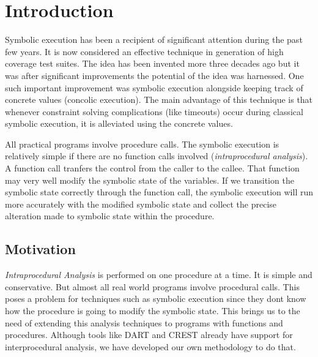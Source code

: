 \documentclass[12pt,oneside]{book}
\begin{document}
\mainmatter


\chapter{Introduction}


\hspace {0.4 cm}
Symbolic execution has been a recipient of significant attention during the past few years. It is now considered an effective technique in generation of high coverage test suites. The idea has been invented more three decades ago\cite{decadeslater} but it was after significant improvements the potential of the idea was harnessed. One such important improvement was symbolic execution alongside keeping track of concrete values (concolic execution)\cite{concolicTesting}. The main advantage of this technique is that whenever constraint solving complications (like timeouts) occur during classical symbolic execution, it is alleviated using the concrete values.

All practical programs involve procedure calls. The symbolic execution is relatively simple if there are no function calls involved (\textit{intraprocedural analysis}). A function call tranfers the control from the caller to the callee. That function may very well modify the symbolic state of the variables. If we transition the symbolic state correctly through the function call, the symbolic execution will run more accurately with the modified symbolic state and collect the precise alteration made to symbolic state within the procedure.    


\section{Motivation}
\textit{Intraprocedural Analysis} is performed on one procedure at a time. It is simple and conservative. But almost all real world programs involve procedural calls. This poses a problem for techniques such as symbolic execution since they dont know how the procedure is going to modify the symbolic state. This brings us to the need of extending this analysis techniques to programs with functions and procedures. Although tools like DART\cite{dart} and CREST\cite{crest} already have support for interprocedural analysis, we have developed our own methodology to do that.\\
\end{document}
